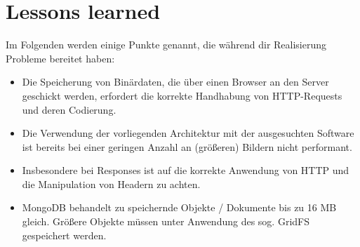 \section{Lessons learned}
Im Folgenden werden einige Punkte genannt, die während dir Realisierung Probleme bereitet haben:
\begin{itemize}
	\item Die Speicherung von Binärdaten, die über einen Browser an den Server geschickt werden,
	erfordert die korrekte Handhabung von HTTP-Requests und deren Codierung.
	\item Die Verwendung der vorliegenden Architektur mit der ausgesuchten Software 
	ist bereits bei einer geringen Anzahl an (größeren) Bildern nicht performant.
	\item Insbesondere bei Responses ist auf die korrekte Anwendung von HTTP und die Manipulation von Headern zu achten.
	\item MongoDB behandelt zu speichernde Objekte / Dokumente bis zu 16 MB gleich. Größere Objekte
	müssen unter Anwendung des sog. GridFS gespeichert werden.
\end{itemize}